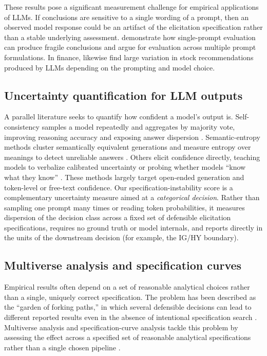\documentclass[a4paper,fleqn]{cas-sc}
\begin{document}
These results pose a significant measurement challenge for empirical applications of LLMs. If conclusions
are sensitive to a single wording of a prompt, then an observed model response could be an artifact of
the elicitation specification rather than a stable underlying assessment. \citet{mizrahi2024multiprompt}
demonstrate how single-prompt evaluation can produce fragile conclusions and argue for evaluation across
multiple prompt formulations. In finance, \citet{chon2025variability} likewise find large variation in
stock recommendations produced by LLMs depending on the prompting and model choice.

\subsection{Uncertainty quantification for LLM outputs}
A parallel literature seeks to quantify how confident a model's output is. Self-consistency samples a model
repeatedly and aggregates by majority vote, improving reasoning accuracy and exposing answer dispersion
\citep{wang2023selfconsistency}. Semantic-entropy methods cluster semantically equivalent generations and
measure entropy over meanings to detect unreliable answers \citep{kuhn2023semantic}. Others elicit
confidence directly, teaching models to verbalize calibrated uncertainty \citep{lin2022teaching} or
probing whether models ``know what they know'' \citep{kadavath2022language}. These methods largely target
open-ended generation and token-level or free-text confidence. Our specification-instability score is a
complementary uncertainty measure aimed at a \emph{categorical decision}. Rather than sampling one prompt
many times or reading token probabilities, it measures dispersion of the decision class across a fixed set
of defensible elicitation specifications, requires no ground truth or model internals, and reports directly
in the units of the downstream decision (for example, the IG/HY boundary).

\subsection{Multiverse analysis and specification curves}
Empirical results often depend on a set of reasonable analytical choices rather than a single, uniquely
correct specification. The problem has been described as the ``garden of forking paths,'' in which
several defensible decisions can lead to different reported results even in the absence of intentional
specification search \citep{gelman2013garden,simmons2011false}. Multiverse analysis and
specification-curve analysis tackle this problem by assessing the effect across a specified set of
reasonable analytical specifications rather than a single chosen pipeline
\citep{steegen2016multiverse,simonsohn2020specification}.
\end{document}
